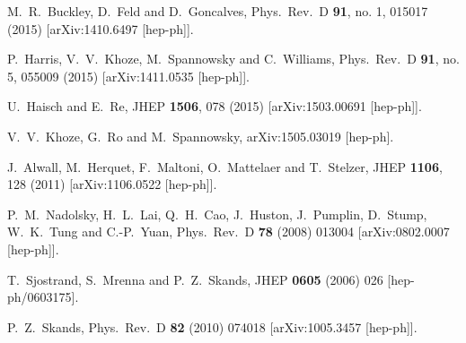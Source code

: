 \documentclass[preprintnumbers,superscriptaddress,nofootinbib,aps,prd,floatfix]{revtex4}
\begin{document}
\begin{thebibliography}{99}
  M.~R.~Buckley, D.~Feld and D.~Goncalves,
  Phys.\ Rev.\ D {\bf 91}, no. 1, 015017 (2015)
  [arXiv:1410.6497 [hep-ph]].

  P.~Harris, V.~V.~Khoze, M.~Spannowsky and C.~Williams,
  Phys.\ Rev.\ D {\bf 91}, no. 5, 055009 (2015)
  [arXiv:1411.0535 [hep-ph]].

  U.~Haisch and E.~Re,
  JHEP {\bf 1506}, 078 (2015)
  [arXiv:1503.00691 [hep-ph]].
  
  
  V.~V.~Khoze, G.~Ro and M.~Spannowsky,
  arXiv:1505.03019 [hep-ph].


  J.~Alwall, M.~Herquet, F.~Maltoni, O.~Mattelaer and T.~Stelzer,
  JHEP {\bf 1106}, 128 (2011)
  [arXiv:1106.0522 [hep-ph]].
 
  
  P.~M.~Nadolsky, H.~L.~Lai, Q.~H.~Cao, J.~Huston, J.~Pumplin, D.~Stump, W.~K.~Tung and C.-P.~Yuan,
  Phys.\ Rev.\ D {\bf 78} (2008) 013004
  [arXiv:0802.0007 [hep-ph]].

  T.~Sjostrand, S.~Mrenna and P.~Z.~Skands,
  JHEP {\bf 0605} (2006) 026
  [hep-ph/0603175].
  
  P.~Z.~Skands,
  Phys.\ Rev.\ D {\bf 82} (2010) 074018
  [arXiv:1005.3457 [hep-ph]].


\end{thebibliography}
\end{document}
